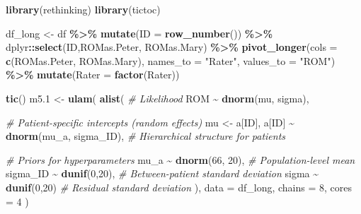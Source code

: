 \documentclass[
]{book}
\newenvironment{Shaded}{\begin{snugshade}}{\end{snugshade}}
\newcommand{\AttributeTok}[1]{\textcolor[rgb]{0.13,0.29,0.53}{#1}}
\newcommand{\CommentTok}[1]{\textcolor[rgb]{0.56,0.35,0.01}{\textit{#1}}}
\newcommand{\DecValTok}[1]{\textcolor[rgb]{0.00,0.00,0.81}{#1}}
\newcommand{\FloatTok}[1]{\textcolor[rgb]{0.00,0.00,0.81}{#1}}
\newcommand{\FunctionTok}[1]{\textcolor[rgb]{0.13,0.29,0.53}{\textbf{#1}}}
\newcommand{\NormalTok}[1]{#1}
\newcommand{\OtherTok}[1]{\textcolor[rgb]{0.56,0.35,0.01}{#1}}
\newcommand{\SpecialCharTok}[1]{\textcolor[rgb]{0.81,0.36,0.00}{\textbf{#1}}}
\newcommand{\StringTok}[1]{\textcolor[rgb]{0.31,0.60,0.02}{#1}}
\begin{document}
\begin{Shaded}
\begin{Highlighting}[]
\FunctionTok{library}\NormalTok{(rethinking)}
\FunctionTok{library}\NormalTok{(tictoc)}

\NormalTok{df\_long }\OtherTok{\textless{}{-}}\NormalTok{ df }\SpecialCharTok{\%\textgreater{}\%} 
  \FunctionTok{mutate}\NormalTok{(}\AttributeTok{ID =} \FunctionTok{row\_number}\NormalTok{()) }\SpecialCharTok{\%\textgreater{}\%}
\NormalTok{  dplyr}\SpecialCharTok{::}\FunctionTok{select}\NormalTok{(ID,ROMas.Peter, ROMas.Mary) }\SpecialCharTok{\%\textgreater{}\%} 
  \FunctionTok{pivot\_longer}\NormalTok{(}\AttributeTok{cols =} \FunctionTok{c}\NormalTok{(ROMas.Peter, ROMas.Mary), }
               \AttributeTok{names\_to =} \StringTok{"Rater"}\NormalTok{, }\AttributeTok{values\_to =} \StringTok{"ROM"}\NormalTok{) }\SpecialCharTok{\%\textgreater{}\%} 
  \FunctionTok{mutate}\NormalTok{(}\AttributeTok{Rater =} \FunctionTok{factor}\NormalTok{(Rater))}

\FunctionTok{tic}\NormalTok{()}
\NormalTok{m5}\FloatTok{.1} \OtherTok{\textless{}{-}} \FunctionTok{ulam}\NormalTok{(}
  \FunctionTok{alist}\NormalTok{(}
    \CommentTok{\# Likelihood}
\NormalTok{    ROM }\SpecialCharTok{\textasciitilde{}} \FunctionTok{dnorm}\NormalTok{(mu, sigma),}
    
    \CommentTok{\# Patient{-}specific intercepts (random effects)}
\NormalTok{    mu }\OtherTok{\textless{}{-}}\NormalTok{ a[ID],  }
\NormalTok{    a[ID] }\SpecialCharTok{\textasciitilde{}} \FunctionTok{dnorm}\NormalTok{(mu\_a, sigma\_ID),  }\CommentTok{\# Hierarchical structure for patients}
    
    \CommentTok{\# Priors for hyperparameters}
\NormalTok{    mu\_a }\SpecialCharTok{\textasciitilde{}} \FunctionTok{dnorm}\NormalTok{(}\DecValTok{66}\NormalTok{, }\DecValTok{20}\NormalTok{),  }\CommentTok{\# Population{-}level mean}
\NormalTok{    sigma\_ID }\SpecialCharTok{\textasciitilde{}} \FunctionTok{dunif}\NormalTok{(}\DecValTok{0}\NormalTok{,}\DecValTok{20}\NormalTok{),  }\CommentTok{\# Between{-}patient standard deviation}
\NormalTok{    sigma }\SpecialCharTok{\textasciitilde{}} \FunctionTok{dunif}\NormalTok{(}\DecValTok{0}\NormalTok{,}\DecValTok{20}\NormalTok{)  }\CommentTok{\# Residual standard deviation}
\NormalTok{  ), }
  \AttributeTok{data =}\NormalTok{ df\_long, }
  \AttributeTok{chains =} \DecValTok{8}\NormalTok{, }\AttributeTok{cores =} \DecValTok{4}
\NormalTok{)}
\end{Highlighting}
\end{Shaded}
\end{document}
